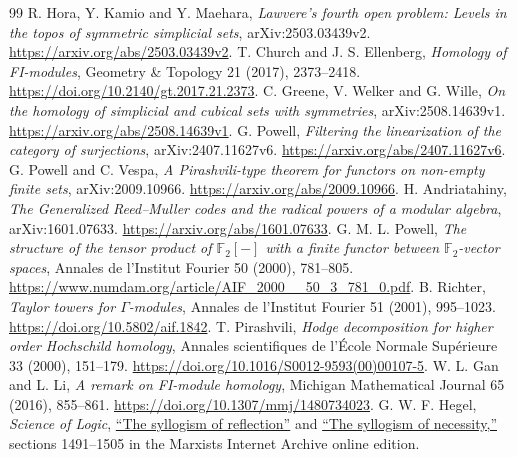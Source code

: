 \documentclass[11pt,a4paper]{article}
\theoremstyle{definition}
\theoremstyle{remark}
\newcommand{\Ftwo}{\mathbb F_2}
\begin{document}
\begin{thebibliography}{99}
\small
{} R. Hora, Y. Kamio and Y. Maehara, \emph{Lawvere's fourth open problem: Levels in the topos of symmetric simplicial sets}, arXiv:2503.03439v2. \url{https://arxiv.org/abs/2503.03439v2}.
 T. Church and J. S. Ellenberg, \emph{Homology of FI-modules}, Geometry \& Topology 21 (2017), 2373--2418. \url{https://doi.org/10.2140/gt.2017.21.2373}.
 C. Greene, V. Welker and G. Wille, \emph{On the homology of simplicial and cubical sets with symmetries}, arXiv:2508.14639v1. \url{https://arxiv.org/abs/2508.14639v1}.
 G. Powell, \emph{Filtering the linearization of the category of surjections}, arXiv:2407.11627v6. \url{https://arxiv.org/abs/2407.11627v6}.
 G. Powell and C. Vespa, \emph{A Pirashvili-type theorem for functors on non-empty finite sets}, arXiv:2009.10966. \url{https://arxiv.org/abs/2009.10966}.
 H. Andriatahiny, \emph{The Generalized Reed--Muller codes and the radical powers of a modular algebra}, arXiv:1601.07633. \url{https://arxiv.org/abs/1601.07633}.
 G. M. L. Powell, \emph{The structure of the tensor product of $\Ftwo[-]$ with a finite functor between $\Ftwo$-vector spaces}, Annales de l'Institut Fourier 50 (2000), 781--805. \url{https://www.numdam.org/article/AIF_2000__50_3_781_0.pdf}.
 B. Richter, \emph{Taylor towers for $\Gamma$-modules}, Annales de l'Institut Fourier 51 (2001), 995--1023. \url{https://doi.org/10.5802/aif.1842}.
 T. Pirashvili, \emph{Hodge decomposition for higher order Hochschild homology}, Annales scientifiques de l'\'Ecole Normale Sup\'erieure 33 (2000), 151--179. \url{https://doi.org/10.1016/S0012-9593(00)00107-5}.
 W. L. Gan and L. Li, \emph{A remark on FI-module homology}, Michigan Mathematical Journal 65 (2016), 855--861. \url{https://doi.org/10.1307/mmj/1480734023}.
 G. W. F. Hegel, \emph{Science of Logic},
\href{https://www.marxists.org/reference/archive/hegel/works/hl/hl687.htm}{``The syllogism of reflection''} and
\href{https://www.marxists.org/reference/archive/hegel/works/hl/hlsyllog.htm}{``The syllogism of necessity,''}
sections 1491--1505 in the Marxists Internet Archive online edition.
\end{thebibliography}
\end{document}

